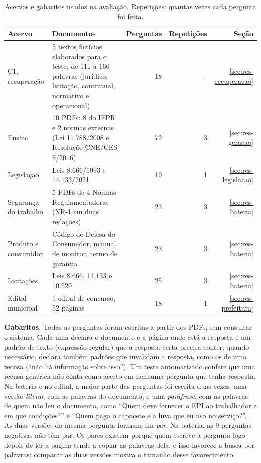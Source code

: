 \documentclass[12pt]{article}
\newcommand{\fonte}{\par\vspace{3pt}{\footnotesize Fonte: o autor.}\par}
\begin{document}
\begin{table}[!htbp]
\centering
\caption{Acervos e gabaritos usados na avaliação. Repetições: quantas vezes cada pergunta foi feita.}
\label{tab:corpora}
\small
\begin{tabular}{p{3.9cm}p{4.3cm}rrr}
\toprule
Acervo & Documentos & Perguntas & Repetições & Seção \\
\midrule
C1, recuperação & 5 textos fictícios elaborados para o teste, de 111 a 166 palavras (jurídico, licitação, contratual, normativo e operacional) & 18 & -- & \ref{sec:res-recuperacao} \\
Ensino & 10 PDFs: 8 do IFPR e 2 normas externas (Lei 11.788/2008 e Resolução CNE/CES 5/2016) & 72 & 3 & \ref{sec:res-geracao} \\
Legislação & Leis 8.666/1993 e 14.133/2021 & 19 & 1 & \ref{sec:res-legislacao} \\
Segurança do trabalho & 5 PDFs de 4 Normas Regulamentadoras (NR-1 em duas redações) & 23 & 3 & \ref{sec:res-bateria} \\
Produto e consumidor & Código de Defesa do Consumidor, manual de monitor, termo de garantia & 23 & 3 & \ref{sec:res-bateria} \\
Licitações & Leis 8.666, 14.133 e 10.520 & 25 & 3 & \ref{sec:res-bateria} \\
Edital municipal & 1 edital de concurso, 52 páginas & 18 & 1 & \ref{sec:res-prefeitura} \\
\bottomrule
\end{tabular}
\fonte
\end{table}

\textbf{Gabaritos.} Todas as perguntas foram escritas a partir dos PDFs, sem consultar o sistema. Cada uma declara o documento e a página onde está a resposta e um padrão de texto (expressão regular) que a resposta certa precisa conter; quando necessário, declara também padrões que invalidam a resposta, como os de uma recusa (``não há informação sobre isso''). Um teste automatizado confere que uma recusa genérica não conta como acerto em nenhuma pergunta que tenha resposta. Na bateria e no edital, a maior parte das perguntas foi escrita duas vezes: uma versão \emph{literal}, com as palavras do documento, e uma \emph{paráfrase}, com as palavras de quem não leu o documento, como ``Quem deve fornecer o EPI ao trabalhador e em que condições?'' e ``Quem paga o capacete e a luva que eu uso no serviço?''. As duas versões da mesma pergunta formam um \emph{par}. Na bateria, as 9 perguntas negativas não têm par. Os pares existem porque quem escreve a pergunta logo depois de ler a página tende a copiar as palavras dela, e isso favorece a busca por palavras; comparar as duas versões mostra o tamanho desse favorecimento.
\end{document}
